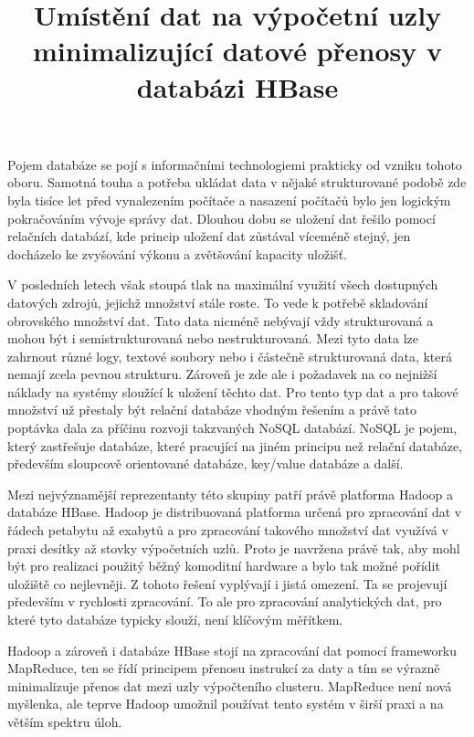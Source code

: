 \documentclass[thesis=M,czech]{FITthesis}[2012/06/26]
\title{Umístění dat na výpočetní uzly minimalizující datové přenosy v databázi HBase}
\begin{document}
\lstset{language=sh}  

\begin{introduction}
Pojem databáze se pojí s informačními technologiemi prakticky od vzniku tohoto oboru. Samotná touha a potřeba ukládat data v nějaké strukturované podobě zde byla tisíce let před vynalezením počítače a nasazení počítačů bylo jen logickým pokračováním vývoje správy dat. Dlouhou dobu se uložení dat řešilo pomocí relačních databází, kde princip uložení dat zůstával víceméně stejný, jen docházelo ke zvyšování výkonu a zvětšování kapacity uložišť.

 V posledních letech však stoupá tlak na maximální využití všech dostupných datových zdrojů, jejichž množství stále roste. To vede k potřebě skladování obrovského množství dat. Tato data nicméně nebývají vždy strukturovaná a mohou být i semistrukturovaná nebo nestrukturovaná. Mezi tyto data lze zahrnout různé logy, textové soubory nebo i částečně strukturovaná data, která nemají zcela pevnou strukturu. Zároveň je zde ale i požadavek na co nejnižší náklady na systémy sloužící k uložení těchto dat. Pro tento typ dat a pro takové množství už přestaly být relační databáze vhodným řešením a právě tato poptávka dala za příčinu rozvoji takzvaných NoSQL databází. NoSQL je pojem, který zastřešuje databáze, které pracující na jiném principu než relační databáze, především sloupcově orientované databáze, key/value databáze a další. 
 
 
Mezi nejvýznamější reprezentanty této skupiny patří právě platforma Hadoop a databáze HBase. Hadoop je distribuovaná platforma určená pro zpracování dat v řádech petabytu až exabytů a pro zpracování takového množství dat využívá v praxi desítky až stovky výpočetních uzlů. Proto je navržena právě tak, aby mohl být pro realizaci použitý běžný komoditní hardware a bylo tak možné pořídit uložiště co nejlevněji. Z tohoto řešení vyplývají i jistá omezení. Ta se projevují především v rychlosti zpracování. To ale pro zpracování analytických dat, pro které tyto databáze typicky slouží, není klíčovým měřítkem.


Hadoop a zároveň i databáze HBase stojí na zpracování dat pomocí frameworku MapReduce, ten se řídí principem přenosu instrukcí za daty a tím se výrazně minimalizuje přenos dat mezi uzly výpočteního clusteru. MapReduce není nová myšlenka, ale teprve Hadoop umožnil používat tento systém v širší praxi a na větším spektru úloh.



\end{introduction}
\end{document}
